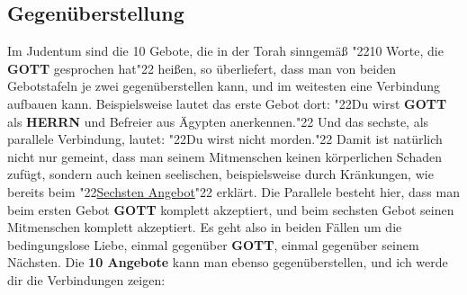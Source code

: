\documentclass[12pt,a4paper]{article}
\newcommand{\Gott}[0]{\textbf{GOTT}}
\newcommand{\Herrn}[0]{\textbf{HERRN}}
\newcommand{\q}[1]{\char"22{#1}\char"22 }
\begin{document}
	\subsection{Gegen\"uberstellung}
		Im Judentum sind die 10 Gebote,
		die in der Torah sinngem\"a{\ss} \q{10 Worte, die {\Gott} gesprochen hat} hei{\ss}en,
		so \"uberliefert,
		dass man von beiden Gebotstafeln je zwei gegen\"uberstellen kann,
		und im weitesten eine Verbindung aufbauen kann.
		Beispielsweise lautet das erste Gebot dort:
		\q{Du wirst {\Gott} als {\Herrn} und Befreier aus Ägypten anerkennen.}
		Und das sechste,
		als parallele Verbindung,
		lautet:
		\q{Du wirst nicht morden.}
		Damit ist nat\"urlich nicht nur gemeint,
		dass man seinem Mitmenschen keinen k\"orperlichen Schaden zuf\"ugt,
		sondern auch keinen seelischen,
		beispielsweise durch Kr\"ankungen,
		wie bereits beim \q{\hyperref[DasSechsteAngebot]{Sechsten Angebot}} erkl\"art.
		Die Parallele besteht hier,
		dass man beim ersten Gebot {\Gott} komplett akzeptiert,
		und beim sechsten Gebot seinen Mitmenschen komplett akzeptiert.
		Es geht also in beiden F\"allen um die bedingungslose Liebe,
		einmal gegen\"uber {\Gott},
		einmal gegen\"uber seinem N\"achsten.
		Die \textbf{10 Angebote} kann man ebenso gegen\"uberstellen,
		und ich werde dir die Verbindungen zeigen:
		\\
\end{document}
